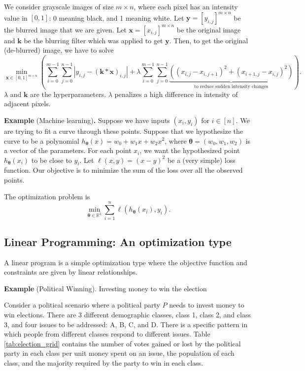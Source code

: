 \documentclass[twoside]{article}
\newcommand\R{\mathbb{R}}
\begin{document}
We consider grayscale images of size $m \times n$, where each pixel has an
intensity value in $[0, 1]$: 0 meaning black, and 1 meaning white.  Let
$\mathbf{y} = [y_{i, j}]^{m \times n}$ be the blurred image that we are given.
Let $\mathbf{x} = [x_{i, j}]^{m \times n}$ be the original image and
$\mathbf{k}$ be the blurring filter which was applied to get $\mathbf{y}$.
Then, to get the original (de-blurred) image, we have to solve \[
    \min_{\mathbf{x} \in [0, 1]^{m \times n}}
    \left(
        \sum_{i = 0}^{m - 1} \sum_{j = 0}^{n - 1}
            |y_{i, j} - (\mathbf{k} * \mathbf{x})_{i, j}|
        + \lambda \sum_{i = 0}^{m - 1} \sum_{j = 0}^{n - 1}
            \underbrace{
                \left((x_{i, j} - x_{i, j + 1})^2
                      + (x_{i + 1, j} - x_{i, j})^2\right)
            }_{
                \text{to reduce sudden intensity changes}
            }
    \right).
\] $\lambda$ and $\mathbf{k}$ are the hyperparameters. $\lambda$ penalizes a
high difference in intensity of adjacent pixels.

\textbf{Example} (Machine learning)\textbf{.} Suppose we have inputs
$(x_i, y_i)$ for $i \in [n].$ We are trying to fit a curve through these points.
Suppose that we hypothesize the curve to be a polynomial
$h_{\boldsymbol{\theta}}(x) = w_0 + w_1x + w_2x^2$, where
$\boldsymbol\theta = (w_0, w_1, w_2)$ is a vector of the parameters. For each
point $x_i$, we want the hypothesized point $h_{\boldsymbol{\theta}}(x_i)$ to be
close to $y_i$. Let $\ell(x, y) = (x - y)^2$ be a (very simple) loss function.
Our objective is to minimize the sum of the loss over all the observed points.

The optimization problem is \[
    \min_{\boldsymbol{\theta} \in \R^3}
        \sum_{i = 1}^{n} \ell(h_{\boldsymbol{\theta}}(x_i), y_i).
\]

\subsection{Linear Programming: An optimization type}
A linear program is a simple optimization type where the objective function and
constraints are given by linear relationships.

\textbf{Example} (Political Winning). Investing money to win the election

Consider a political scenario where a political party $P$ needs to invest money
to win elections. There are 3 different demographic classes, class 1, class 2,
and class 3, and four issues to be addressed: A, B, C, and D. There is a
specific pattern in which people from different classes respond to different
issues. Table \ref{tab:election_grid} contains the number of votes gained or
lost by the political party in each class per unit money spent on an issue, the
population of each class, and the majority required by the party to win in each
class.
\end{document}

